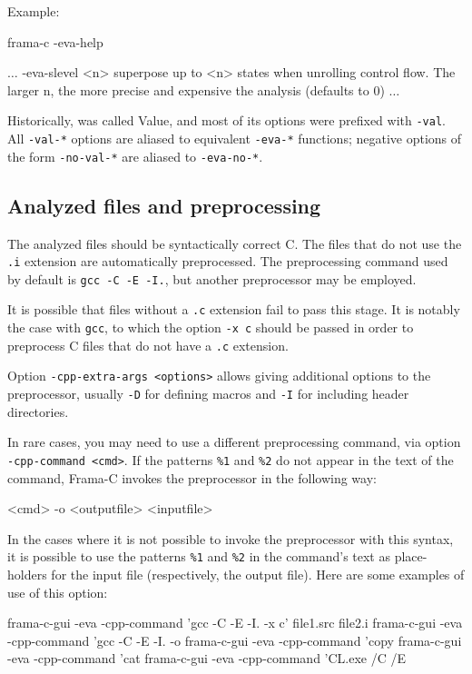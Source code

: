 \documentclass{frama-c-book}
\begin{document}
Example:
\begin{frama-c-commands}
frama-c -eva-help
\end{frama-c-commands}
\begin{logs}
$\dots$
-eva-slevel <n>     superpose up to <n> states when unrolling control flow.
                    The larger n, the more precise and expensive the analysis
                    (defaults to 0)
$\dots$
\end{logs}

\begin{important}
  Historically, \Eva{} was called Value, and most of its options
  were prefixed with \lstinline|-val|. All \lstinline|-val-*| options
  are aliased to equivalent \lstinline|-eva-*| functions; negative options of
  the form \lstinline|-no-val-*| are aliased to \lstinline|-eva-no-*|.
\end{important}

\subsection{Analyzed files and preprocessing}\label{sec:analyz-files-prepr}

The analyzed files should be syntactically correct C. The files
that do not use the {\tt .i} extension are automatically
preprocessed. The preprocessing command used by default is
\lstinline|gcc -C -E -I.|, but another preprocessor may be employed.

It is possible that files without a {\tt .c} extension
fail to pass this stage. It is notably the case with \lstinline|gcc|,
to which the option \lstinline|-x c| should be passed in order to preprocess
C files that do not have a \lstinline|.c| extension.
\goodbreak

Option \lstinline|-cpp-extra-args <options>| allows giving additional options
to the preprocessor, usually \verb|-D| for defining macros and \verb|-I| for
including header directories.

In rare cases, you may need to use a different preprocessing command, via
option \lstinline|-cpp-command <cmd>|.
If the patterns \lstinline|%1| and \lstinline|%2| do not appear
in the text of the
command, Frama-C invokes the preprocessor in the following way:
\begin{frama-c-commands}
<cmd> -o <outputfile> <inputfile>
\end{frama-c-commands}

In the cases where it is not possible to invoke the preprocessor with
this syntax, it is possible to use the
patterns \lstinline|%1| and \lstinline|%2|
in the command's text as place-holders for the input file (respectively,
the output file). Here are some examples of use of this option:
\begin{frama-c-commands}
frama-c-gui -eva -cpp-command 'gcc -C -E -I. -x c' file1.src file2.i
frama-c-gui -eva -cpp-command 'gcc -C -E -I. -o %
frama-c-gui -eva -cpp-command 'copy %
frama-c-gui -eva -cpp-command 'cat %
frama-c-gui -eva -cpp-command 'CL.exe /C /E %
\end{frama-c-commands}
\end{document}
